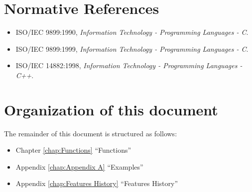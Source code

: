\section{Normative References}
\label{sec:normative references}
\begin{itemize}
\item ISO/IEC 9899:1990, \textsl{Information Technology - Programming Languages - C}.

\item ISO/IEC 9899:1999, \textsl{Information Technology - Programming Languages - C}. 


\item ISO/IEC 14882:1998, \textsl{Information Technology - Programming Languages - C++}. 

\end{itemize}

\pagebreak
\section{Organization of this document}
\label{sec:Organization of this document}
The remainder of this document is structured as follows: 

\begin{itemize}
\item Chapter \ref{chap:Functions} ``Functions''

\item Appendix \ref{chap:Appendix A} ``Examples''

\item Appendix \ref{chap:Features History} ``Features History''
\end{itemize}



